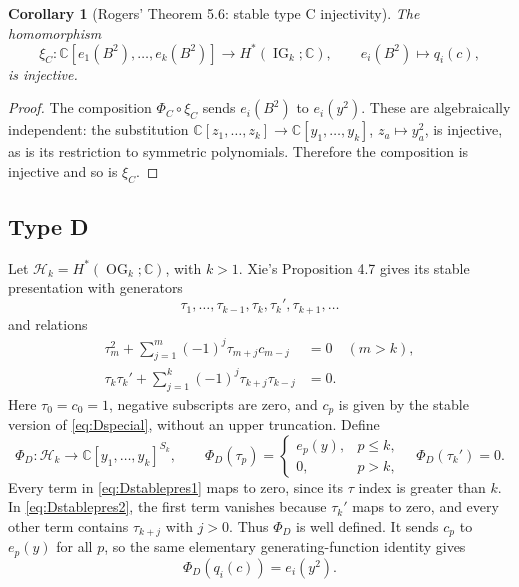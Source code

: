 \documentclass[11pt,letterpaper]{article}
\newtheorem{corollary}[theorem]{Corollary}
\theoremstyle{remark}
\newcommand{\IG}{\operatorname{IG}}
\newcommand{\OG}{\operatorname{OG}}
\newcommand{\C}{\mathbb C}
\begin{document}
\begin{corollary}[Rogers' Theorem 5.6: stable type C injectivity]\label{cor:Cstable}
The homomorphism
\[
 \xi_C:\C[e_1(B^2),\ldots,e_k(B^2)]\longrightarrow H^*(\IG_k;\C),
 \qquad e_i(B^2)\longmapsto q_i(c),
\]
is injective.
\end{corollary}
\begin{proof}
The composition $\Phi_C\circ\xi_C$ sends $e_i(B^2)$ to $e_i(y^2)$. These are algebraically independent: the substitution $\C[z_1,\ldots,z_k]\to\C[y_1,\ldots,y_k]$, $z_a\mapsto y_a^2$, is injective, as is its restriction to symmetric polynomials. Therefore the composition is injective and so is $\xi_C$.
\end{proof}

\subsection{Type D}
Let $\mathcal H_k=H^*(\OG_k;\C)$, with $k>1$. Xie's Proposition 4.7 gives its stable presentation with generators
\[
 \tau_1,\ldots,\tau_{k-1},\tau_k,\tau_k',\tau_{k+1},\ldots
\]
and relations
\begin{align}
 \tau_m^2+\sum_{j=1}^{m}(-1)^j\tau_{m+j}c_{m-j}&=0\quad(m>k),
 \label{eq:Dstablepres1}\\
 \tau_k\tau_k'+\sum_{j=1}^{k}(-1)^j\tau_{k+j}\tau_{k-j}&=0.
 \label{eq:Dstablepres2}
\end{align}
Here $\tau_0=c_0=1$, negative subscripts are zero, and $c_p$ is given by the stable version of \eqref{eq:Dspecial}, without an upper truncation. Define
\begin{equation}
 \Phi_D:\mathcal H_k\longrightarrow\C[y_1,\ldots,y_k]^{S_k},
 \qquad
 \Phi_D(\tau_p)=
 \begin{cases}e_p(y),&p\leq k,\\0,&p>k,\end{cases}
 \quad \Phi_D(\tau_k')=0.
 \label{eq:Dspecialization}
\end{equation}
Every term in \eqref{eq:Dstablepres1} maps to zero, since its $\tau$ index is greater than $k$. In \eqref{eq:Dstablepres2}, the first term vanishes because $\tau_k'$ maps to zero, and every other term contains $\tau_{k+j}$ with $j>0$. Thus $\Phi_D$ is well defined. It sends $c_p$ to $e_p(y)$ for all $p$, so the same elementary generating-function identity gives
\[
 \Phi_D(q_i(c))=e_i(y^2).
\]
\end{document}
